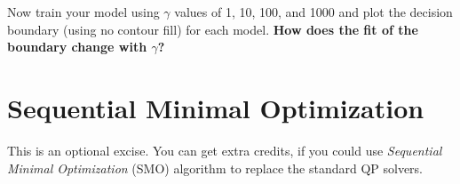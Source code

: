 \documentclass[10pt,a4paper]{article}
\begin{document}
  Now train your model using $\gamma$ values of 1, 10, 100, and 1000 and plot the decision boundary (using no contour fill) for each model. \textbf{How does the fit of the boundary change with $\gamma$?}


\section{Sequential Minimal Optimization}
%
  This is an optional excise. You can get extra credits, if you could use \textit{Sequential Minimal Optimization} (SMO) algorithm to replace the standard QP solvers.
\end{document}
